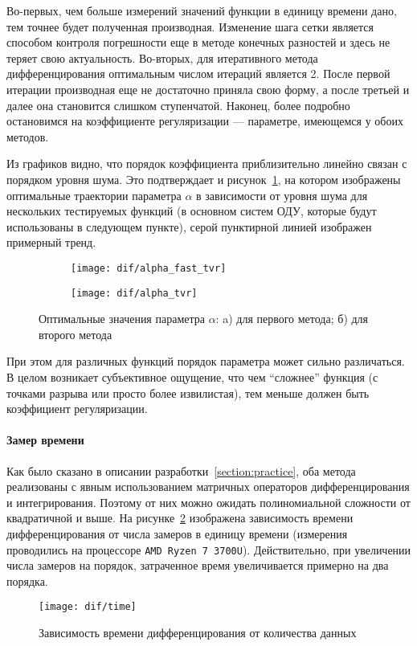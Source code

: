 Во-первых, чем больше измерений значений функции в единицу времени дано, тем точнее будет полученная производная. Изменение шага сетки является способом контроля погрешности еще в методе конечных разностей и здесь не теряет свою актуальность. Во-вторых, для итеративного метода дифференцирования оптимальным числом итераций является 2. После первой итерации производная еще не достаточно приняла свою форму, а после третьей и далее она становится слишком ступенчатой. Наконец, более подробно остановимся на коэффициенте регуляризации --- параметре, имеющемся у обоих методов.

Из графиков видно, что порядок коэффициента приблизительно линейно связан с порядком уровня шума. Это подтверждает и рисунок~\ref{fig:dif:alpha_test}, на котором изображены оптимальные траектории параметра $\alpha$ в зависимости от уровня шума для нескольких тестируемых функций (в основном систем ОДУ, которые будут использованы в следующем пункте), серой пунктирной линией изображен примерный тренд.

\begin{figure}
\begin{subfigure}[t]{0.9\linewidth}
	\centering
	\texttt{[image: dif/alpha\_fast\_tvr]}
	\caption{}
\end{subfigure}

\begin{subfigure}[t]{0.9\linewidth}
	\centering
	\texttt{[image: dif/alpha\_tvr]}
	\caption{}
\end{subfigure}
\caption{Оптимальные значения параметра $\alpha$: a) для первого метода; б) для второго метода}
\label{fig:dif:alpha_test}
\end{figure}

При этом для различных функций порядок параметра может сильно различаться. В целом возникает субъективное ощущение, что чем \enquote{сложнее} функция (с точками разрыва или просто более извилистая), тем меньше должен быть коэффициент регуляризации.

\paragraph{Замер времени}

Как было сказано в описании разработки~\ref{section:practice}, оба метода реализованы с явным использованием матричных операторов дифференцирования и интегрирования. Поэтому от них можно ожидать полиномиальной сложности от квадратичной и выше. На рисунке~\ref{fig:dif:time} изображена зависимость времени дифференцирования от числа замеров в единицу времени (измерения проводились на процессоре \texttt{AMD Ryzen 7 3700U}). Действительно, при увеличении числа замеров на порядок, затраченное время увеличивается примерно на два порядка.

\begin{figure}
\texttt{[image: dif/time]}
\caption{Зависимость времени дифференцирования от количества данных}
\label{fig:dif:time}
\end{figure}
